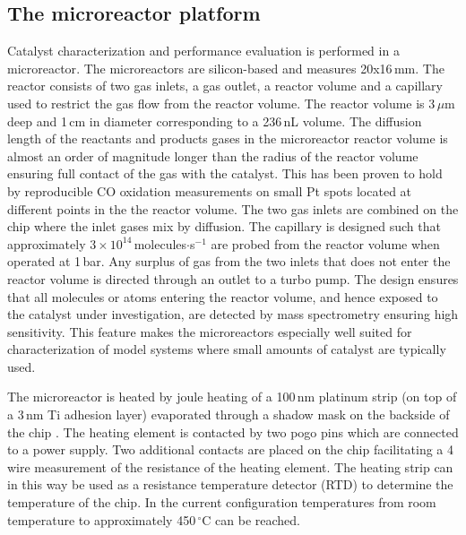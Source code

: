 \documentclass[aip,rsi]{revtex4-1}
\begin{document}
\subsection{The microreactor platform}
Catalyst characterization and performance evaluation is performed in a microreactor\cite{Henriksen2009}. The microreactors are silicon-based and measures 20x16\,mm. The reactor consists of two gas inlets, a gas outlet, a reactor volume and a capillary used to restrict the gas flow from the reactor volume. The reactor volume is 3\,$\mu$m deep and 1\,cm in diameter corresponding to a 236\,nL volume. The diffusion length of the reactants and products gases in the microreactor reactor volume is almost an order of magnitude longer than the radius of the reactor volume ensuring full contact of the gas with the catalyst. This has been proven to hold by reproducible CO oxidation measurements on small Pt spots located at different points in the the reactor volume. The two gas inlets are combined on the chip where the inlet gases mix by diffusion. The capillary is designed such that approximately $3\times10^{14}$\,molecules$\cdot$s$^{-1}$ are probed from the reactor volume when operated at 1\,bar. Any surplus of gas from the two inlets that does not enter the reactor volume is directed through an outlet to a turbo pump. The design ensures that all molecules or atoms entering the reactor volume, and hence exposed to the catalyst under investigation, are detected by mass spectrometry ensuring high sensitivity. This feature makes the microreactors especially well suited for characterization of model systems where small amounts of catalyst are typically used. 

The microreactor is heated by joule heating of a 100\,nm platinum strip (on top of a 3\,nm Ti adhesion layer) evaporated through a shadow mask on the backside of the chip . The heating element is contacted by two pogo pins which are connected to a power supply. Two additional contacts are placed on the chip facilitating a 4 wire measurement of the resistance of the heating element. The heating strip can in this way be used as a resistance temperature detector (RTD) to determine the temperature of the chip. In the current configuration temperatures from room temperature to approximately 450\,$^{\circ}$C can be reached.
\end{document}
